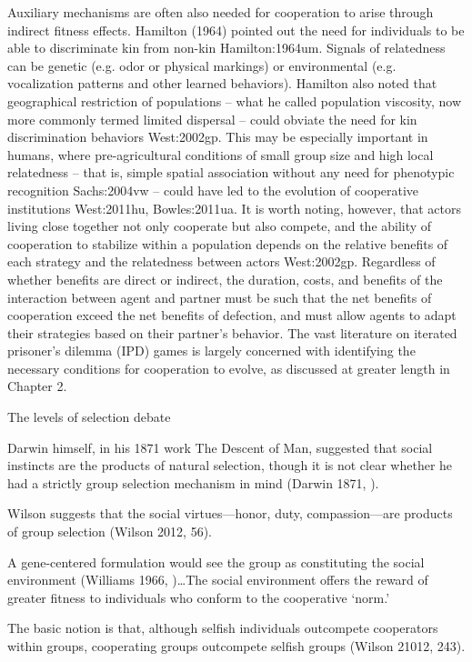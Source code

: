 \documentclass{tufte-book} %
\begin{document}
Auxiliary mechanisms are often also needed for cooperation to arise through indirect fitness effects. Hamilton (1964) pointed out the need for individuals to be able to discriminate kin from non-kin {Hamilton:1964um}. Signals of relatedness can be genetic (e.g. odor or physical markings) or environmental (e.g. vocalization patterns and other learned behaviors). Hamilton also noted that geographical restriction of populations – what he called population viscosity, now more commonly termed limited dispersal – could obviate the need for kin discrimination behaviors {West:2002gp}. This may be especially important in humans, where pre-agricultural conditions of small group size and high local relatedness – that is, simple spatial association without any need for phenotypic recognition {Sachs:2004vw} – could have led to the evolution of cooperative institutions {West:2011hu, Bowles:2011ua}. It is worth noting, however, that actors living close together not only cooperate but also compete, and the ability of cooperation to stabilize within a population depends on the relative benefits of each strategy and the relatedness between actors {West:2002gp}.
Regardless of whether benefits are direct or indirect, the duration, costs, and benefits of the interaction between agent and partner must be such that the net benefits of cooperation exceed the net benefits of defection, and must allow agents to adapt their strategies based on their partner’s behavior. The vast literature on iterated prisoner’s dilemma (IPD) games is largely concerned with identifying the necessary conditions for cooperation to evolve, as discussed at greater length in Chapter 2. 






The levels of selection debate

Darwin himself, in his 1871 work The Descent of Man, suggested that social instincts are the products of natural selection, though it is not clear whether he had a strictly group selection mechanism in mind (Darwin 1871, ).

Wilson suggests that the social virtues—honor, duty, compassion—are products of group selection (Wilson 2012, 56).

A gene-centered formulation would see the group as constituting the social environment (Williams 1966, )…The social environment offers the reward of greater fitness to individuals who conform to the cooperative ‘norm.’

The basic notion is that, although selfish individuals outcompete cooperators within groups, cooperating groups outcompete selfish groups (Wilson 21012, 243).
\end{document}
